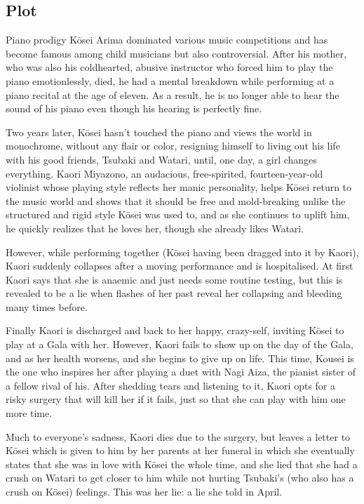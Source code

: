 \documentclass[a4paper,10pt]{article}
\begin{document}
\begin{CJK}{UTF8}{min}
\begin{table}[h]
\begin{tabular}{r|l}
\end{tabular}
\end{table}

\newpage
\subsection{Plot}
Piano prodigy Kōsei Arima dominated various music competitions and has become famous among child musicians but also controversial. After his mother, who was also his coldhearted, abusive instructor who forced him to play the piano emotionlessly, died, he had a mental breakdown while performing at a piano recital at the age of eleven. As a result, he is no longer able to hear the sound of his piano even though his hearing is perfectly fine.

Two years later, Kōsei hasn't touched the piano and views the world in monochrome, without any flair or color, resigning himself to living out his life with his good friends, Tsubaki and Watari, until, one day, a girl changes everything. Kaori Miyazono, an audacious, free-spirited, fourteen-year-old violinist whose playing style reflects her manic personality, helps Kōsei return to the music world and shows that it should be free and mold-breaking unlike the structured and rigid style Kōsei was used to, and as she continues to uplift him, he quickly realizes that he loves her, though she already likes Watari.

However, while performing together (Kōsei having been dragged into it by Kaori), Kaori suddenly collapses after a moving performance and is hospitalised. At first Kaori says that she is anaemic and just needs some routine testing, but this is revealed to be a lie when flashes of her past reveal her collapsing and bleeding many times before.

Finally Kaori is discharged and back to her happy, crazy-self, inviting Kōsei to play at a Gala with her. However, Kaori fails to show up on the day of the Gala, and as her health worsens, and she begins to give up on life. This time, Kousei is the one who inspires her after playing a duet with Nagi Aiza, the pianist sister of a fellow rival of his. After shedding tears and listening to it, Kaori opts for a risky surgery that will kill her if it fails, just so that she can play with him one more time.

Much to everyone's sadness, Kaori dies due to the surgery, but leaves a letter to Kōsei which is given to him by her parents at her funeral in which she eventually states that she was in love with Kōsei the whole time, and she lied that she had a crush on Watari to get closer to him while not hurting Tsubaki's (who also has a crush on Kōsei) feelings. This was her lie: a lie she told in April.


\end{CJK}
\end{document}
